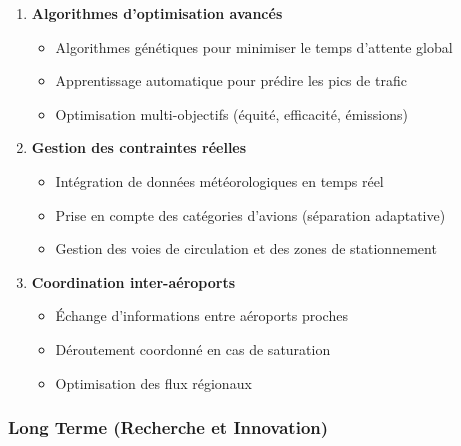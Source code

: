 \documentclass[12pt,a4paper]{article}
\begin{document}
\begin{enumerate}[leftmargin=*]
    \item \textbf{Algorithmes d'optimisation avancés}
    \begin{itemize}
        \item Algorithmes génétiques pour minimiser le temps d'attente global
        \item Apprentissage automatique pour prédire les pics de trafic
        \item Optimisation multi-objectifs (équité, efficacité, émissions)
    \end{itemize}

    \item \textbf{Gestion des contraintes réelles}
    \begin{itemize}
        \item Intégration de données météorologiques en temps réel
        \item Prise en compte des catégories d'avions (séparation adaptative)
        \item Gestion des voies de circulation et des zones de stationnement
    \end{itemize}

    \item \textbf{Coordination inter-aéroports}
    \begin{itemize}
        \item Échange d'informations entre aéroports proches
        \item Déroutement coordonné en cas de saturation
        \item Optimisation des flux régionaux
    \end{itemize}
\end{enumerate}

\subsubsection{Long Terme (Recherche et Innovation)}
\end{document}
